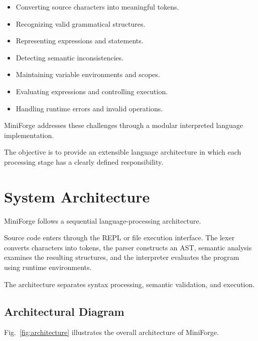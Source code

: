 \documentclass[conference]{IEEEtran}
\begin{document}
\begin{itemize}
    \item Converting source characters into meaningful tokens.
    \item Recognizing valid grammatical structures.
    \item Representing expressions and statements.
    \item Detecting semantic inconsistencies.
    \item Maintaining variable environments and scopes.
    \item Evaluating expressions and controlling execution.
    \item Handling runtime errors and invalid operations.
\end{itemize}

MiniForge addresses these challenges through a modular
interpreted language implementation.

The objective is to provide an extensible language
architecture in which each processing stage has a
clearly defined responsibility.

\section{System Architecture}

MiniForge follows a sequential language-processing
architecture.

Source code enters through the REPL or file execution
interface. The lexer converts characters into tokens,
the parser constructs an AST, semantic analysis
examines the resulting structures, and the interpreter
evaluates the program using runtime environments.

The architecture separates syntax processing,
semantic validation, and execution.

\subsection{Architectural Diagram}

Fig.~\ref{fig:architecture} illustrates the overall
architecture of MiniForge.
\end{document}
